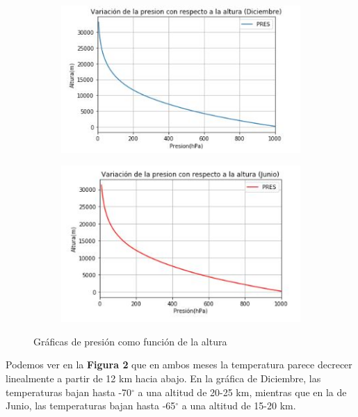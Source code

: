 \documentclass[a4paper]{article}
\begin{document}
\begin{figure}[ht!]
\centering
\begin{subfigure}{0.49\textwidth}
\centering
\includegraphics[width = \textwidth]{Presion_altura_dec.JPG}

\end{subfigure}
\begin{subfigure}{0.49\textwidth}
\centering
\includegraphics[width = \textwidth]{Presion_altura_jun.JPG}

\end{subfigure}
\caption{Gráficas de presión como función de la altura}
\label{fig:combined}
\end{figure}

\newpage



Podemos ver en la \textbf{Figura 2} que en ambos meses la temperatura parece decrecer linealmente a partir de 12 km hacia abajo. En la gráfica de Diciembre, las temperaturas bajan hasta -70$^{\circ}$ a una altitud de 20-25 km, mientras que en la de Junio, las temperaturas bajan hasta -65$^{\circ}$ a una altitud de 15-20 km. 
\end{document}

